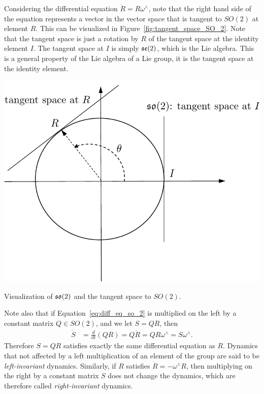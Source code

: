 Considering the differential equation $\dot{R}=R\omega^\wedge$, note that the right hand side of the equation represents a vector in the vector space that is tangent to $SO(2)$ at element $R$.  This can be visualized in Figure~\ref{fig:tangent_space_SO_2}.  Note that the tangent space is just a rotation by $R$ of the tangent space at the identity element $I$.  The tangent space at $I$ is simply $\mathfrak{se}(2)$, which is the Lie algebra.  This is a general property of the Lie algebra of a Lie group, it is the tangent space at the identity element.
\begin{marginfigure}[0in]
  \centering\includegraphics[width=\linewidth]{./chap2_preliminaries/figures/tangent_space_SO_2}
  \caption{Visualization of $\mathfrak{so}(2)$ and the tangent space to $SO(2)$.}
  \label{fig:tangent_space_SO_2}  
\end{marginfigure}

Note also that if Equation~\eqref{eq:diff_eq_so_2} is multiplied on the left by a constant matrix $Q\in SO(2)$, and we let $S=QR$, then
\begin{align*}
\dot{S} &= \frac{d}{dt}(QR) 
        = Q\dot{R} 
        = QR\omega^\wedge 
        = S\omega^\wedge.
\end{align*}
Therefore $S=QR$ satisfies exactly the same differential equation as $R$.  Dynamics that not affected by a left multiplication of an element of the group are said to be {\em left-invariant} dynamics.
Similarly, if $R$ satisfies $\dot{R} = -\omega^\wedge R$, then multiplying on the right by a constant matrix $S$ does not change the dynamics, which are therefore called {\em right-invariant} dynamics.



